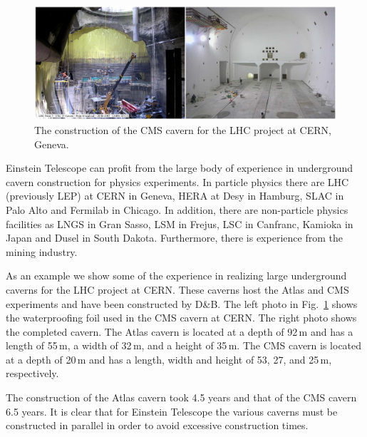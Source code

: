 \begin{figure}[htbp!]
\centering
\includegraphics[width=16cm]{./Sec_SiteInfra/Figures/lhc.jpg}
\caption{The construction of the CMS cavern for the LHC project at CERN, Geneva.}
\label{fig:lhc}
\end{figure}
Einstein Telescope can profit from the large body of experience in underground cavern construction
for physics experiments. In particle physics there are LHC (previously LEP) at
CERN in Geneva, HERA at Desy in Hamburg, SLAC in Palo Alto and Fermilab in Chicago.
In addition, there are non-particle physics facilities as LNGS in Gran Sasso, LSM in Frejus, 
LSC in Canfranc, Kamioka in Japan and Dusel in South Dakota. 
Furthermore, there is experience from the mining industry.

As an example we show some of the experience in realizing large underground
caverns for the LHC project at CERN. These caverns host the Atlas and CMS experiments 
and have been constructed by D\&B. The left photo in Fig.~\ref{fig:lhc} shows the 
waterproofing foil used in the CMS
cavern at CERN. The right photo shows the completed cavern.
The Atlas cavern is located at a depth of 92\,m
and has a length of 55\,m, a width of 32\,m, and a height of 35\,m. The CMS
cavern is located at a depth of 20\,m and has a length, width and height of
53, 27, and 25\,m, respectively.

The construction of the Atlas cavern took 4.5 years and that of the CMS cavern 6.5 years. 
It is clear that for Einstein Telescope the various caverns must be constructed in parallel
in order to avoid excessive construction times.

\FloatBarrier
